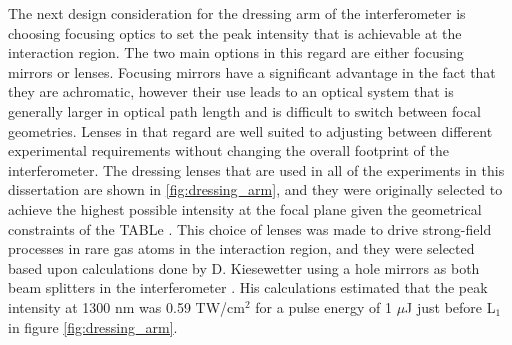 The next design consideration for the dressing arm of the interferometer is choosing focusing optics to set the peak intensity that is achievable at the interaction region.  The two main options in this regard are either focusing mirrors or lenses.  Focusing mirrors have a significant advantage in the fact that they are achromatic, however their use leads to an optical system that is generally larger in optical path length and is difficult to switch between focal geometries. Lenses in that regard are well suited to adjusting between different experimental requirements without changing the overall footprint of the interferometer.  The dressing lenses that are used in all of the experiments in this dissertation are shown in \ref{fig:dressing_arm}, and they were originally selected to achieve the highest possible intensity at the focal plane given the geometrical constraints of the TABLe \cite{kiesewetterDynamicsNearThresholdAttosecond2019}. This choice of lenses was made to drive strong-field processes in rare gas atoms in the interaction region, and they were selected based upon calculations done by D. Kiesewetter using a hole mirrors as both beam splitters in the interferometer \cite{kiesewetterDynamicsNearThresholdAttosecond2019}. His calculations estimated that the peak intensity at 1300 nm was 0.59 TW/cm$^2$ for a pulse energy of 1 $\mu$J just before L$_1$ in figure \ref{fig:dressing_arm}.

